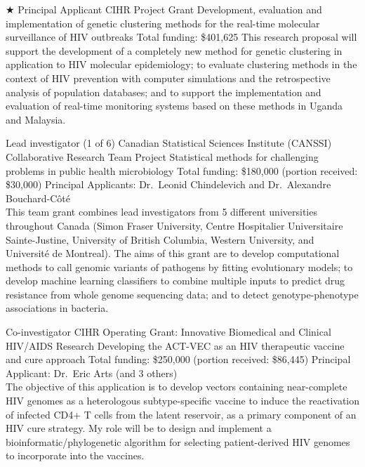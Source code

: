 \documentclass[11pt]{moderncv}
\begin{document}
{$\bigstar$ Principal Applicant}
{CIHR Project Grant} %
{Development, evaluation and implementation of genetic clustering methods for the real-time molecular surveillance of HIV outbreaks}
{Total funding: \$401,625}
{
This research proposal will support the development of a completely new method for genetic clustering in application to HIV molecular epidemiology; 
to evaluate clustering methods in the context of HIV prevention with computer simulations and the retrospective analysis of population databases; 
and to support the implementation and evaluation of real-time monitoring systems based on these methods in Uganda and Malaysia.\\
}


{Lead investigator (1 of 6)}
{Canadian Statistical Sciences Institute (CANSSI) Collaborative Research Team Project}
{Statistical   methods   for   challenging   problems   in   public   health   microbiology}
{Total funding: \$180,000 (portion received: \$30,000)}
{Principal Applicants: Dr.~Leonid Chindelevich and Dr.~Alexandre Bouchard-C\^ot\'e\\
This team grant combines lead investigators from 5 different universities throughout Canada (Simon Fraser University,  Centre Hospitalier Universitaire Sainte-Justine, University of British Columbia, Western University, and Universit\'e de Montreal).
The aims of this grant are to develop computational methods to call genomic variants of pathogens by fitting evolutionary models; to develop machine learning classifiers to combine multiple inputs to predict drug resistance from whole genome sequencing data; and to detect genotype-phenotype associations in bacteria.\\
}

{Co-investigator}
{CIHR Operating Grant: Innovative Biomedical and Clinical HIV/AIDS Research}
{Developing the ACT-VEC as an HIV therapeutic vaccine and cure approach}
{Total funding: \$250,000 (portion received: \$86,445)}
{
Principal Applicant: Dr.~Eric Arts (and 3 others)\\
The objective of this application is to develop vectors containing near-complete HIV genomes as a heterologous subtype-specific vaccine to induce the reactivation of infected CD4+ T cells from the latent reservoir, as a primary component of an HIV cure strategy.
My role will be to design and implement a bioinformatic/phylogenetic algorithm for selecting patient-derived HIV genomes to incorporate into the vaccines.\\
}
\end{document}
